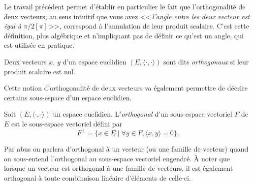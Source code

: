 \documentclass[11pt, a4paper]{article}
\begin{document}
Le travail précédent permet d'établir en particulier le fait que
l'orthogonalité de deux vecteurs, au sens intuitif que vous avez
<<\,\textit{l'angle entre les deux vecteur est égal à $\pi/2 [\pi]$}\,>>,
correspond à l'annulation de leur produit scalaire. C'est cette
définition, plus algébrique et n'impliquant pas de définir ce qu'est
un angle, qui est utilisée en pratique.
\begin{defn}
  Deux vecteurs $x$, $y$ d'un espace euclidien
  $(E, \langle \cdot, \cdot \rangle)$ sont dits \emph{orthogonaux} si
  leur produit scalaire est nul.
\end{defn}
Cette notion d'orthogonalité de deux vecteurs va également permettre
de décrire certains sous-espace d'un espace euclidien.
\begin{defn}
  Soit $(E, \langle \cdot, \cdot \rangle)$ un espace
  euclidien. L'\emph{orthogonal} d'un sous-espace vectoriel $F$ de $E$
  est le sous-espace vectoriel défini par
  \[
    F^\perp = \{x \in E \mid \forall y \in F, \langle x, y \rangle =
    0\}.
  \]
\end{defn}
Par abus on parlera d'orthogonal à un vecteur (ou une famille de
vecteur) quand on sous-entend l'orthogonal au sous-espace vectoriel
engendré. À noter que lorsque un vecteur est orthogonal à une famille
de vecteurs, il est également orthogonal à toute combinaison linéaire
d'éléments de celle-ci.
\end{document}
